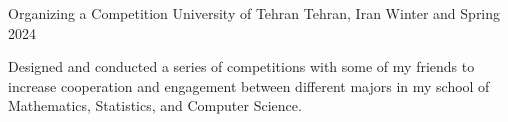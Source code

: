 \vspace{-20pt}

\begin{cventries}
  \cventry
  {Organizing a Competition}
  {University of Tehran}
  {Tehran, Iran}
  {Winter and Spring 2024}
  {
    \begin{cvitems}
      \item {Designed and conducted a series of competitions with some of my friends to increase cooperation and engagement between different majors in my school of Mathematics, Statistics, and Computer Science.}
    \end{cvitems}
  }
\end{cventries}

